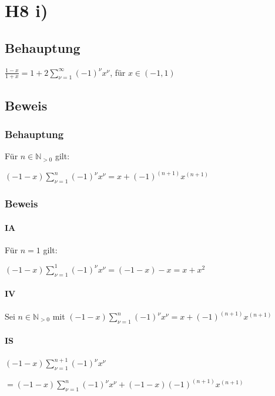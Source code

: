 \section*{H8 i)}

\subsection*{Behauptung}

$ \frac{1-x}{1+x} = 1 + 2 \sum\limits_{\nu=1}^{\infty} (-1)^{\nu} x^{\nu}$, für $x \in (-1,1) $

\subsection*{Beweis}

\subsubsection*{Behauptung}

Für $n \in \mathbb{N}_{>0}$ gilt:

$(-1-x)\sum\limits^{n}_{\nu=1}(-1)^{\nu}x^{\nu} = x+(-1)^{(n+1)}x^{(n+1)}$

\subsubsection*{Beweis}

\paragraph*{IA}

Für $n = 1$ gilt:


$(-1-x)\sum\limits^{1}_{\nu=1}(-1)^{\nu}x^{\nu} =(-1-x)-x= x+x^{2}$

\paragraph*{IV}

Sei $n \in \mathbb{N}_{>0}$ mit 
$(-1-x)\sum\limits^{n}_{\nu=1}(-1)^{\nu}x^{\nu} = x+(-1)^{(n+1)}x^{(n+1)}$

\paragraph*{IS}

$  (-1-x)\sum\limits^{n+1}_{\nu=1}(-1)^{\nu}x^{\nu} $

$ = (-1-x)\sum\limits^{n}_{\nu = 1}(-1)^{\nu} x^{\nu} + (-1-x) (-1)^{(n+1)} x^{(n+1)} $

